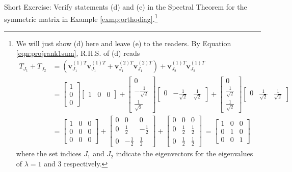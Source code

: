 Short Exercise: Verify statements (d) and (e) in the Spectral Theorem for the symmetric matrix in Example \ref{exmp:orthodiag}.\footnote{We will just show (d) here and leave (e) to the readers. By Equation \ref{eqn:projrank1sum}, R.H.S. of (d) reads
\begin{align*}
T_{J_1} + T_{J_2} &= (\textbf{v}_{J_1}^{(1)T}\textbf{v}_{J_1}^{(1)T} + \textbf{v}_{J_1}^{(2)T}\textbf{v}_{J_1}^{(2)T}) + \textbf{v}_{J_2}^{(1)T}\textbf{v}_{J_2}^{(1)T} \\
&= \begin{bmatrix}
1 \\
0 \\
0
\end{bmatrix}
\begin{bmatrix}
1 & 0 & 0
\end{bmatrix} + 
\begin{bmatrix}
0 \\
-\frac{1}{\sqrt{2}} \\
\frac{1}{\sqrt{2}}
\end{bmatrix}
\begin{bmatrix}
0 & -\frac{1}{\sqrt{2}} & \frac{1}{\sqrt{2}}
\end{bmatrix} +
\begin{bmatrix}
0 \\
\frac{1}{\sqrt{2}} \\
\frac{1}{\sqrt{2}}
\end{bmatrix}
\begin{bmatrix}
0 & \frac{1}{\sqrt{2}} & \frac{1}{\sqrt{2}}
\end{bmatrix} \\
&=
\begin{bmatrix}
1 & 0 & 0 \\
0 & 0 & 0 \\
0 & 0 & 0
\end{bmatrix}
+
\begin{bmatrix}
0 & 0 & 0 \\
0 & \frac{1}{2} & -\frac{1}{2} \\
0 & -\frac{1}{2} & \frac{1}{2}
\end{bmatrix}
+
\begin{bmatrix}
0 & 0 & 0 \\
0 & \frac{1}{2} & \frac{1}{2} \\
0 & \frac{1}{2} & \frac{1}{2}
\end{bmatrix}\
=
\begin{bmatrix}
1 & 0 & 0 \\
0 & 1 & 0 \\
0 & 0 & 1
\end{bmatrix}
\end{align*}
where the set indices $J_1$ and $J_2$ indicate the eigenvectors for the eigenvalues of $\lambda = 1$ and $3$ respectively.
}

